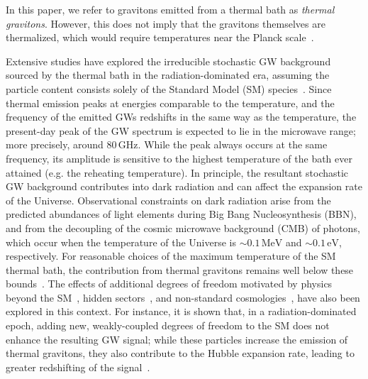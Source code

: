\documentclass[aps,prd,twocolumn,showpacs,superscriptaddress,nofootinbib,preprintnumbers]{revtex4-2}
\begin{document}
In this paper, we refer to gravitons emitted from a thermal bath as {\it thermal gravitons}. However, this does not imply that the gravitons themselves are thermalized, which would require temperatures near the Planck scale~\cite{Kolb:1990vq}. 

Extensive studies have explored the irreducible stochastic GW background sourced by the thermal bath in the radiation-dominated era, assuming the particle content consists solely of the Standard Model (SM) species~\cite{Ghiglieri:2015nfa,Ghiglieri:2020mhm,Ringwald:2020ist}. Since thermal emission peaks at energies comparable to the temperature, and the frequency of the emitted GWs redshifts in the same way as the temperature, the present-day peak of the GW spectrum is expected to lie in the microwave range; more precisely, around 80\,GHz. While the peak always occurs at the same frequency, its amplitude is sensitive to the highest temperature of the bath ever attained (e.g. the reheating temperature). In principle, the resultant stochastic GW background contributes into dark radiation and can affect the expansion rate of the Universe. Observational constraints on dark radiation arise from the predicted abundances of light elements during Big Bang Nucleosynthesis (BBN), and from the decoupling of the cosmic microwave background (CMB) of photons, which occur when the temperature of the Universe is $\sim 0.1\,\text{MeV}$ and $\sim 0.1\,\text{eV}$, respectively. For reasonable choices of the maximum temperature of the SM thermal bath, the contribution from thermal gravitons remains well below these bounds~\cite{Ringwald:2020ist}. 
The effects of additional degrees of freedom motivated by physics beyond the SM~\cite{Ringwald:2020ist}, hidden sectors~\cite{Drewes:2023oxg}, and non-standard cosmologies~\cite{Muia:2023wru,Bernal:2024jim,Ai:2025fqw}, have also been explored in this context. For instance,  it is shown that, in a radiation-dominated epoch, adding new, weakly-coupled degrees of freedom to the SM does not enhance the resulting GW signal; while these particles increase the emission of thermal gravitons, they also contribute to the Hubble expansion rate, leading to greater redshifting of the signal~\cite{Ringwald:2020ist,Muia:2023wru}.

\medskip
\end{document}
